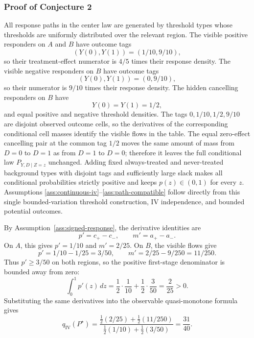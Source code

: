 \documentclass[11pt]{article}
\theoremstyle{definition}
\theoremstyle{plain}
\theoremstyle{remark}
\begin{document}
\subsubsection*{Proof of Conjecture 2}
All response paths in the center law are generated by threshold types whose
thresholds are uniformly distributed over the relevant region.  The visible
positive responders on \(A\) and \(B\) have outcome tags
\[
(Y(0),Y(1))=(1/10,9/10),
\]
so their treatment-effect numerator is \(4/5\) times their response density.
The visible negative responders on \(B\) have outcome tags
\[
(Y(0),Y(1))=(0,9/10),
\]
so their numerator is \(9/10\) times their response density.  The hidden
cancelling responders on \(B\) have
\[
Y(0)=Y(1)=1/2,
\]
and equal positive and negative threshold densities.  The tags
\(0,1/10,1/2,9/10\) are disjoint observed outcome cells, so the derivatives of
the corresponding conditional cell masses identify the visible flows in the
table.  The equal zero-effect cancelling pair at the common tag \(1/2\) moves
the same amount of mass from \(D=0\) to \(D=1\) as from \(D=1\) to \(D=0\);
therefore it leaves the full conditional law \(P_{Y,D\mid Z=z}\) unchanged.
Adding fixed always-treated and never-treated background types with disjoint
tags and sufficiently large slack makes all conditional probabilities strictly
positive and keeps \(p(z)\in(0,1)\) for every \(z\).  Assumptions
\ref{ass:continuous-iv}--\ref{ass:path-compatible} follow directly from this
single bounded-variation threshold construction, IV independence, and bounded
potential outcomes.

By Assumption~\ref{ass:signed-response}, the derivative identities are
\[
p'=c_+-c_-,
\qquad
m'=a_+-a_-.
\]
On \(A\), this gives \(p'=1/10\) and \(m'=2/25\).  On \(B\), the visible
flows give
\[
p'=1/10-1/25=3/50,
\qquad
m'=2/25-9/250=11/250.
\]
Thus \(p'\ge3/50\) on both regions, so the positive first-stage denominator is
bounded away from zero:
\[
\int_0^1p'(z)\,dz
=
\frac12\cdot\frac1{10}+\frac12\cdot\frac3{50}
=\frac2{25}>0.
\]
Substituting the same derivatives into the observable quasi-monotone formula
gives
\[
q_{\mathrm{IV}}(P^\star)
=
\frac{\frac12(2/25)+\frac12(11/250)}
     {\frac12(1/10)+\frac12(3/50)}
=\frac{31}{40}.
\]
\end{document}
